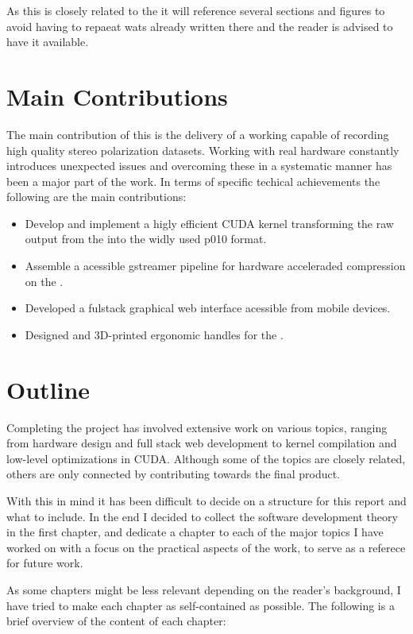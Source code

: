 As this \master is closely related to the \preproject it will reference several sections and figures to avoid having to repaeat wats already written there and the reader is advised to have it available.

\section{Main Contributions}
The main contribution of this \master is the delivery of a working \sr capable of recording high quality stereo polarization datasets.
Working with real hardware constantly introduces unexpected issues and overcoming these in a systematic manner has been a major part of the work.
In terms of specific techical achievements the following are the main contributions:

\begin{itemize}
    \item Develop and implement a higly efficient CUDA kernel transforming the raw output from the \cams into the widly used \gls{p010} format.
    \item Assemble a \py acessible \gls{gstreamer} pipeline for hardware acceleraded compression on the \jx.
    \item Developed a fulstack graphical web interface acessible from mobile devices.
    \item Designed and 3D-printed ergonomic handles for the \sr.
\end{itemize}


\section{Outline}
Completing the \sr project has involved extensive work on various topics, ranging from hardware design and full stack web development to kernel compilation and low-level optimizations in CUDA.
Although some of the topics are closely related, others are only connected  by contributing towards the final product.

With this in mind it has been difficult to decide on a structure for this report and what to include.
In the end I decided to collect the software development theory in the first chapter, and dedicate a chapter to each of the major topics I have worked on with a focus on the practical aspects of the work, to serve as a referece for future work.

As some chapters might be less relevant depending on the reader's background, I have tried to make each chapter as self-contained as possible.
The following is a brief overview of the content of each chapter:

